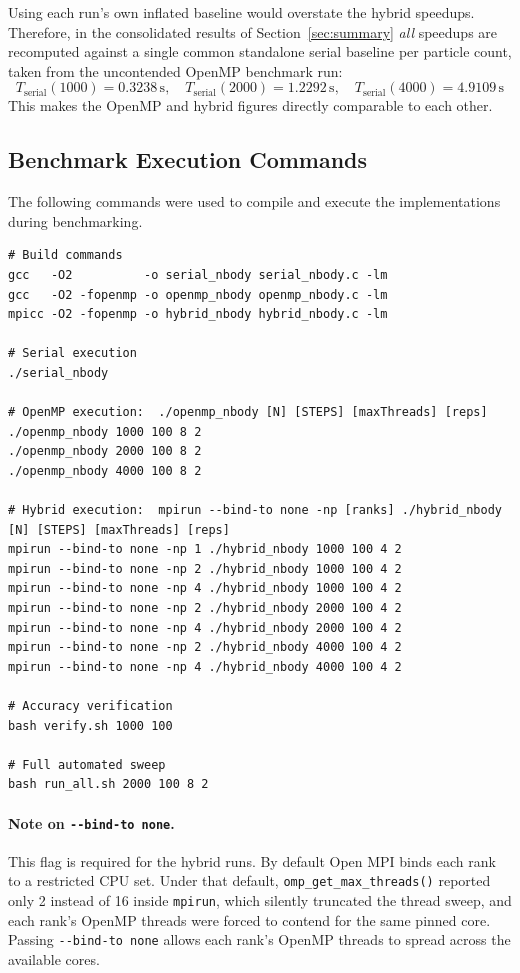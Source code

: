 \documentclass[11pt,a4paper]{article}
\begin{document}
Using each run's own inflated baseline would overstate the hybrid speedups.
Therefore, in the consolidated results of Section~\ref{sec:summary} \emph{all}
speedups are recomputed against a single common standalone serial baseline per
particle count, taken from the uncontended OpenMP benchmark run:
\[
T_{\text{serial}}(1000) = 0.3238\,\text{s},\quad
T_{\text{serial}}(2000) = 1.2292\,\text{s},\quad
T_{\text{serial}}(4000) = 4.9109\,\text{s}
\]
This makes the OpenMP and hybrid figures directly comparable to each other.

\subsection{Benchmark Execution Commands}

The following commands were used to compile and execute the implementations
during benchmarking.

\begin{lstlisting}[style=code,caption={Commands used for benchmarking}]
# Build commands
gcc   -O2          -o serial_nbody serial_nbody.c -lm
gcc   -O2 -fopenmp -o openmp_nbody openmp_nbody.c -lm
mpicc -O2 -fopenmp -o hybrid_nbody hybrid_nbody.c -lm

# Serial execution
./serial_nbody

# OpenMP execution:  ./openmp_nbody [N] [STEPS] [maxThreads] [reps]
./openmp_nbody 1000 100 8 2
./openmp_nbody 2000 100 8 2
./openmp_nbody 4000 100 8 2

# Hybrid execution:  mpirun --bind-to none -np [ranks] ./hybrid_nbody [N] [STEPS] [maxThreads] [reps]
mpirun --bind-to none -np 1 ./hybrid_nbody 1000 100 4 2
mpirun --bind-to none -np 2 ./hybrid_nbody 1000 100 4 2
mpirun --bind-to none -np 4 ./hybrid_nbody 1000 100 4 2
mpirun --bind-to none -np 2 ./hybrid_nbody 2000 100 4 2
mpirun --bind-to none -np 4 ./hybrid_nbody 2000 100 4 2
mpirun --bind-to none -np 2 ./hybrid_nbody 4000 100 4 2
mpirun --bind-to none -np 4 ./hybrid_nbody 4000 100 4 2

# Accuracy verification
bash verify.sh 1000 100

# Full automated sweep
bash run_all.sh 2000 100 8 2
\end{lstlisting}

\paragraph{Note on \texttt{-{}-bind-to none}.}
This flag is required for the hybrid runs. By default Open MPI binds each rank
to a restricted CPU set. Under that default, \texttt{omp\_get\_max\_threads()}
reported only 2 instead of 16 inside \texttt{mpirun}, which silently truncated
the thread sweep, and each rank's OpenMP threads were forced to contend for the
same pinned core. Passing \texttt{-{}-bind-to none} allows each rank's OpenMP
threads to spread across the available cores.
\end{document}
